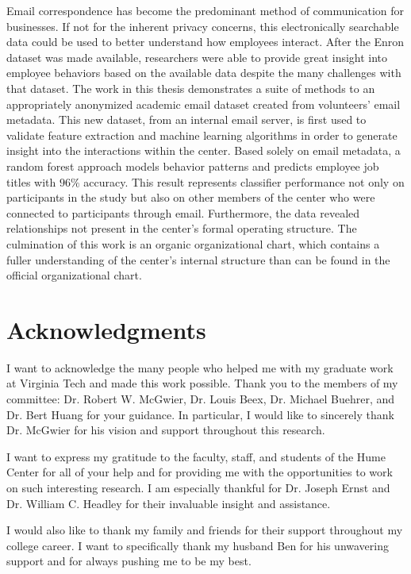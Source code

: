 \documentclass[12pt]{report}
\begin{document}
Email correspondence has become the predominant method of communication for businesses.
If not for the inherent privacy concerns, this electronically searchable data could be used to better understand how employees interact. 
After the Enron dataset was made available, researchers were able to provide great insight into employee behaviors based on the available data despite the many challenges with that dataset.  
The work in this thesis demonstrates a suite of methods to an appropriately anonymized academic email dataset created from volunteers' email metadata.  
This new dataset, from an internal email server, is first used to validate feature extraction and machine learning algorithms in order to generate insight into the interactions within the center.  
Based solely on email metadata, a random forest approach models behavior patterns and predicts employee job titles with $96\%$ accuracy.
This result represents classifier performance not only on participants in the study but also on other members of the center who were connected to participants through email.
Furthermore, the data revealed relationships not present in the center's formal operating structure.
The culmination of this work is an organic organizational chart, which contains a fuller understanding of the center's internal structure than can be found in the official organizational chart.


\vfill



\pagebreak

\chapter*{Acknowledgments}
I want to acknowledge the many people who helped me with my graduate work at Virginia Tech and made this work possible.  Thank you to the members of my committee: Dr. Robert W. McGwier, Dr. Louis Beex, Dr. Michael Buehrer, and Dr. Bert Huang for your guidance.  In particular, I would like to sincerely thank Dr. McGwier for his vision and support throughout this research.  

I want to express my gratitude to the faculty, staff, and students of the Hume Center for all of your help and for providing me with the opportunities to work on such interesting research.  I am especially thankful for Dr. Joseph Ernst and Dr. William C. Headley for their invaluable insight and assistance.

I would also like to thank my family and friends for their support throughout my college career.  I want to specifically thank my husband Ben for his unwavering support and for always pushing me to be my best.
\end{document}
